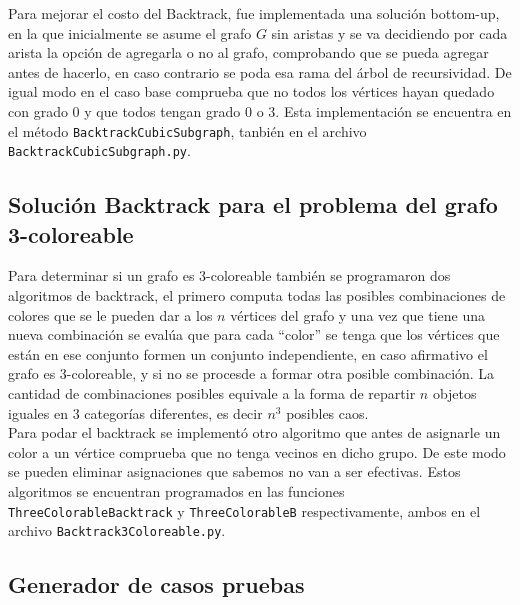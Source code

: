 \documentclass{article}
\begin{document}
Para mejorar el costo del Backtrack, fue implementada una soluci\'on bottom-up, en la que inicialmente se asume el grafo $G$ sin aristas y 
se va decidiendo por cada arista la opci\'on de agregarla o no al grafo, comprobando que se pueda agregar antes de hacerlo, en caso contrario se poda esa rama 
del \'arbol de recursividad. De igual modo en el caso base comprueba que no todos los v\'ertices hayan quedado con grado $0$ y que todos tengan grado $0$ o $3$. 
Esta implementaci\'on se encuentra en el m\'etodo \texttt{BacktrackCubicSubgraph}, tanbi\'en en el archivo \texttt{BacktrackCubicSubgraph.py}.

\subsection*{Soluci\'on Backtrack para el problema del grafo 3-coloreable}

Para determinar si un grafo es $3$-coloreable tambi\'en se programaron dos algoritmos de backtrack, el primero computa todas las posibles 
combinaciones de colores que se le pueden dar a los $n$ v\'ertices del grafo y una vez que tiene una nueva combinaci\'on se eval\'ua que para cada 
``color'' se tenga que los v\'ertices que est\'an en ese conjunto formen un conjunto independiente, en caso afirmativo el grafo es $3$-coloreable, y si no se procesde a formar 
otra posible combinaci\'on. La cantidad de combinaciones posibles equivale a la forma de repartir $n$ objetos iguales en $3$ categor\'ias diferentes, es decir $n^3$ posibles caos.\\ 

Para podar el backtrack se implement\'o otro algoritmo que antes de asignarle un color a un v\'ertice comprueba que no tenga vecinos en dicho grupo. De este modo se pueden 
eliminar asignaciones que sabemos no van a ser efectivas. Estos algoritmos se encuentran programados en las funciones \texttt{ThreeColorableBacktrack} y \texttt{ThreeColorableB} respectivamente, ambos en el archivo 
\texttt{Backtrack3Coloreable.py}.

\subsection*{Generador de casos pruebas}
\end{document}
